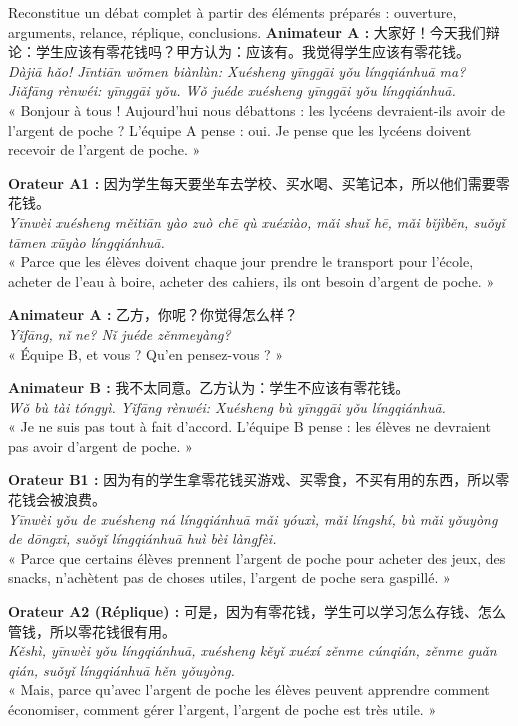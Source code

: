 \documentclass[11pt]{article}
\begin{document}
\begin{exoresolu}
Reconstitue un débat complet à partir des éléments préparés : ouverture, arguments, relance, réplique, conclusions.
\tcblower
\textbf{Animateur A :} 大家好！今天我们辩论：学生应该有零花钱吗？甲方认为：应该有。我觉得学生应该有零花钱。\\
\emph{Dàjiā hǎo! Jīntiān wǒmen biànlùn: Xuésheng yīnggāi yǒu língqiánhuā ma? Jiǎfāng rènwéi: yīnggāi yǒu. Wǒ juéde xuésheng yīnggāi yǒu língqiánhuā.}\\
« Bonjour à tous ! Aujourd'hui nous débattons : les lycéens devraient-ils avoir de l'argent de poche ? L'équipe A pense : oui. Je pense que les lycéens doivent recevoir de l'argent de poche. »

\textbf{Orateur A1 :} 因为学生每天要坐车去学校、买水喝、买笔记本，所以他们需要零花钱。\\
\emph{Yīnwèi xuésheng měitiān yào zuò chē qù xuéxiào, mǎi shuǐ hē, mǎi bǐjìběn, suǒyǐ tāmen xūyào língqiánhuā.}\\
« Parce que les élèves doivent chaque jour prendre le transport pour l'école, acheter de l'eau à boire, acheter des cahiers, ils ont besoin d'argent de poche. »

\textbf{Animateur A :} 乙方，你呢？你觉得怎么样？\\
\emph{Yǐfāng, nǐ ne? Nǐ juéde zěnmeyàng?}\\
« Équipe B, et vous ? Qu'en pensez-vous ? »

\textbf{Animateur B :} 我不太同意。乙方认为：学生不应该有零花钱。\\
\emph{Wǒ bù tài tóngyì. Yǐfāng rènwéi: Xuésheng bù yīnggāi yǒu língqiánhuā.}\\
« Je ne suis pas tout à fait d'accord. L'équipe B pense : les élèves ne devraient pas avoir d'argent de poche. »

\textbf{Orateur B1 :} 因为有的学生拿零花钱买游戏、买零食，不买有用的东西，所以零花钱会被浪费。\\
\emph{Yīnwèi yǒu de xuésheng ná língqiánhuā mǎi yóuxì, mǎi língshí, bù mǎi yǒuyòng de dōngxi, suǒyǐ língqiánhuā huì bèi làngfèi.}\\
« Parce que certains élèves prennent l'argent de poche pour acheter des jeux, des snacks, n'achètent pas de choses utiles, l'argent de poche sera gaspillé. »

\textbf{Orateur A2 (Réplique) :} 可是，因为有零花钱，学生可以学习怎么存钱、怎么管钱，所以零花钱很有用。\\
\emph{Kěshì, yīnwèi yǒu língqiánhuā, xuésheng kěyǐ xuéxí zěnme cúnqián, zěnme guǎn qián, suǒyǐ língqiánhuā hěn yǒuyòng.}\\
« Mais, parce qu'avec l'argent de poche les élèves peuvent apprendre comment économiser, comment gérer l'argent, l'argent de poche est très utile. »


\end{exoresolu}
\end{document}
